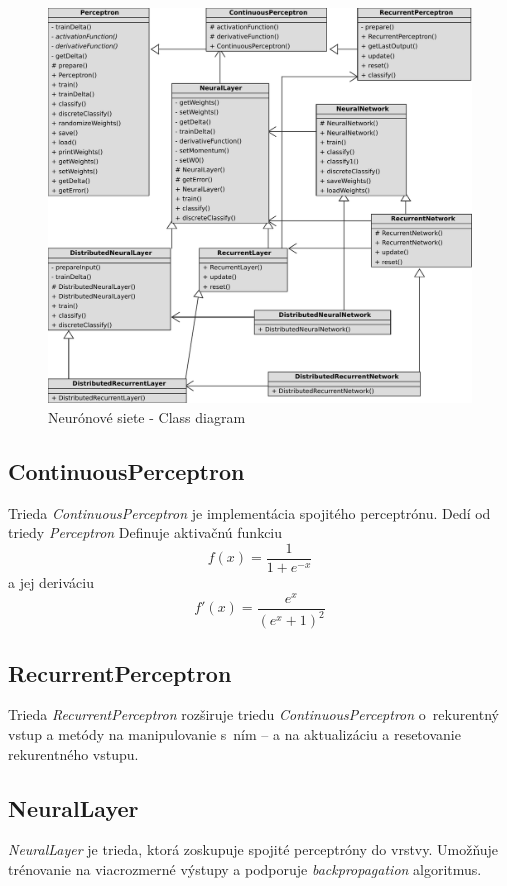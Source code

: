\begin{figure}[htbp]
    \centering
    \includegraphics[width=\textwidth]{images/nn_class_diagram}
    \caption{Neurónové siete - Class diagram}
    \label{fig:nnclsdiag}
\end{figure}


\subsection{ContinuousPerceptron}
Trieda \textit{ContinuousPerceptron} je implementácia spojitého perceptrónu. Dedí od triedy \textit{Perceptron} 
Definuje aktivačnú funkciu
$$f(x)=\frac{1}{1+e^{-x}} $$
a jej deriváciu
$$f'(x)=\frac{e^x}{(e^x+1)^2} $$

\subsection{RecurrentPerceptron}
Trieda \textit{RecurrentPerceptron} rozširuje triedu \textit{ContinuousPerceptron} o~rekurentný vstup a metódy na manipulovanie s~ním --  a  na aktualizáciu a resetovanie rekurentného vstupu.

\subsection{NeuralLayer}
\textit{NeuralLayer} je trieda, ktorá zoskupuje spojité perceptróny do vrstvy. Umožňuje trénovanie na viacrozmerné výstupy a podporuje \textit{backpropagation} algoritmus. 

